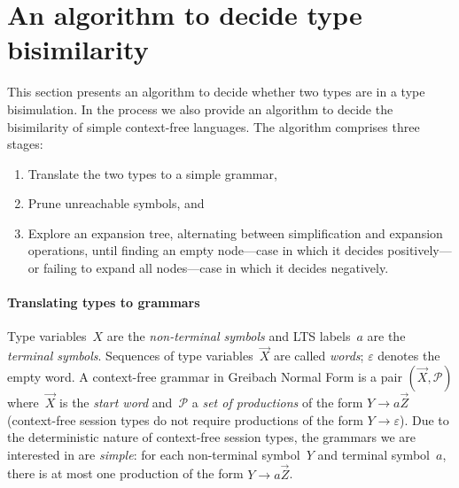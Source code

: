 \section{An algorithm to decide type bisimilarity}
\label{sec:algorithm}



This section presents an algorithm to decide whether two types are in
a type bisimulation. In the process we also provide an algorithm to
decide the bisimilarity of simple context-free languages.
%
The algorithm comprises three stages:
%
\begin{enumerate}
\item Translate the two types to a simple grammar,
\item Prune unreachable symbols, and
\item Explore an expansion tree, alternating between simplification
  and expansion operations, until finding an empty node---case
  in which it decides positively---or failing to expand all nodes---case
  in which it decides negatively.
\end{enumerate}

\paragraph{Translating types to grammars}


Type variables~$X$ are the \emph{non-terminal symbols} and LTS
labels~$a$ are the \emph{terminal symbols}. Sequences of type
variables~$\vec X$ are called \emph{words}; $\varepsilon$ denotes the
empty word.
%
A context-free grammar in Greibach Normal Form is a pair
$(\vec X,\mathcal P)$ where~$\vec X$ is the \emph{start word}
and~$\mathcal P$ a \emph{set of productions} of the form
$Y \rightarrow a\vec Z$ (context-free session types do not require
productions of the form $Y \rightarrow\varepsilon$).
%
Due to the deterministic nature of context-free session types, the
grammars we are interested in are \emph{simple}: for each
non-terminal symbol~$Y$ and terminal symbol~$a$, there is at most
one production of the form $Y \rightarrow a\vec Z$.

